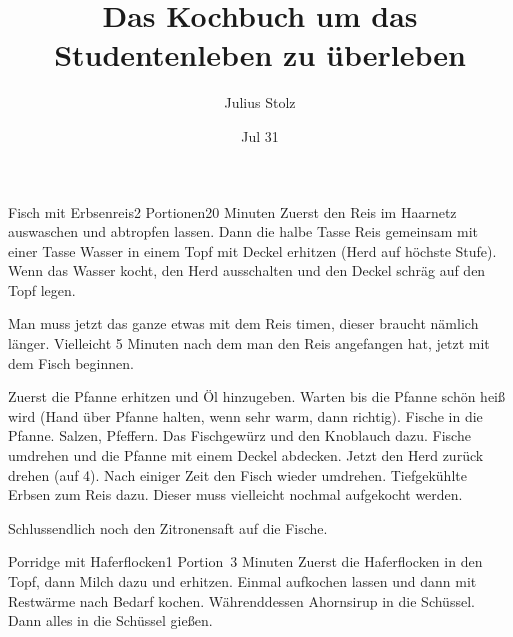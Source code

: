 \documentclass{article}
\title{Das Kochbuch um das Studentenleben zu überleben}
\author{Julius Stolz}
\date{Jul 31}
\begin{document}
\maketitle

\begin{recipe}{Fisch mit Erbsenreis}{2 Portionen}{20 Minuten}
  Zuerst den Reis im Haarnetz auswaschen und abtropfen lassen. Dann die halbe Tasse Reis gemeinsam mit einer Tasse Wasser in einem Topf mit Deckel erhitzen (Herd auf höchste Stufe). Wenn das Wasser kocht, den Herd ausschalten und den Deckel schräg auf den Topf legen.

  Man muss jetzt das ganze etwas mit dem Reis timen, dieser braucht nämlich länger. Vielleicht 5 Minuten nach dem man den Reis angefangen hat, jetzt mit dem Fisch beginnen.

  Zuerst die Pfanne erhitzen und Öl hinzugeben. Warten bis die Pfanne schön heiß wird (Hand über Pfanne halten, wenn sehr warm, dann richtig).
  Fische in die Pfanne. Salzen, Pfeffern. Das Fischgewürz und den Knoblauch dazu. Fische umdrehen und die Pfanne mit einem Deckel abdecken. Jetzt den Herd zurück drehen (auf 4). Nach einiger Zeit den Fisch wieder umdrehen.
  Tiefgekühlte Erbsen zum Reis dazu. Dieser muss vielleicht nochmal aufgekocht werden.
  
  Schlussendlich noch den Zitronensaft auf die Fische.
\end{recipe}

\begin{recipe}{Porridge mit Haferflocken}{1 Portion}{~3 Minuten}
  Zuerst die Haferflocken in den Topf, dann Milch dazu und erhitzen. Einmal aufkochen lassen und dann mit Restwärme nach Bedarf kochen.
  Währenddessen Ahornsirup in die Schüssel. Dann alles in die Schüssel gießen.
\end{recipe}

\end{document}
